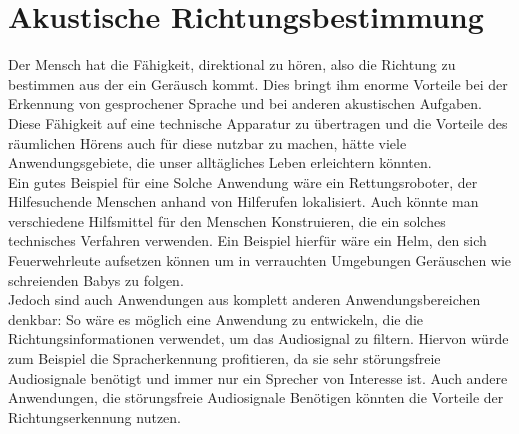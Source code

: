 \section{Akustische Richtungsbestimmung}
Der Mensch hat die Fähigkeit, direktional zu hören, also die Richtung zu bestimmen aus der ein Geräusch kommt. Dies bringt ihm enorme Vorteile bei der Erkennung von gesprochener Sprache und bei anderen akustischen Aufgaben. Diese Fähigkeit auf eine technische Apparatur zu übertragen und die Vorteile des räumlichen Hörens auch für diese nutzbar zu machen, hätte viele Anwendungsgebiete, die unser alltägliches Leben erleichtern könnten.\\
Ein gutes Beispiel für eine Solche Anwendung wäre ein Rettungsroboter, der Hilfesuchende Menschen anhand von Hilferufen lokalisiert. Auch könnte man verschiedene Hilfsmittel für den Menschen Konstruieren, die ein solches technisches Verfahren verwenden. Ein Beispiel hierfür wäre ein Helm, den sich Feuerwehrleute aufsetzen können um in verrauchten Umgebungen Geräuschen wie schreienden Babys zu folgen.\\
Jedoch sind auch Anwendungen aus komplett anderen Anwendungsbereichen denkbar: So wäre es möglich eine Anwendung zu entwickeln, die die Richtungsinformationen verwendet, um das Audiosignal zu filtern. Hiervon würde zum Beispiel die Spracherkennung profitieren, da sie sehr störungsfreie Audiosignale benötigt und immer nur ein Sprecher von Interesse ist\cite{Spracherkennung}. Auch andere Anwendungen, die störungsfreie Audiosignale Benötigen könnten die Vorteile der Richtungserkennung nutzen. 
